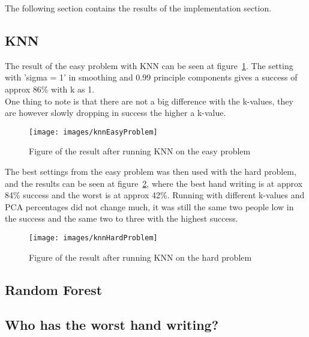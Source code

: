 \documentclass[report]{subfiles}
\begin{document}
\label{sec:result}
The following section contains the results of the implementation section.

\subsection{KNN}
\label{sec:resultKNN}
The result of the easy problem with KNN can be seen at figure~\ref{fig:knnEasyProblem}. The setting with 'sigma = 1' in smoothing and 0.99 principle components gives a success of approx 86\% with k as 1.\\
One thing to note is that there are not a big difference with the k-values, they are however slowly dropping in success the higher a k-value.

\begin{figure}[H]
	\centering
	\texttt{[image: images/knnEasyProblem]}
	\caption{Figure of the result after running KNN on the easy problem}
	\label{fig:knnEasyProblem}
\end{figure}

The best settings from the easy problem was then used with the hard problem, and the results can be seen at figure~\ref{fig:knnHardProblem}, where the best hand writing is at approx 84\% success and the worst is at approx 42\%. Running with different k-values and PCA percentages did not change much, it was still the same two people low in the success and the same two to three with the highest success.

\begin{figure}[H]
	\centering
	\texttt{[image: images/knnHardProblem]}
	\caption{Figure of the result after running KNN on the hard problem}
	\label{fig:knnHardProblem}
\end{figure}

\subsection{Random Forest}
\label{sec:resultRandomForest}

\subsection{Who has the worst hand writing?}
\end{document}
